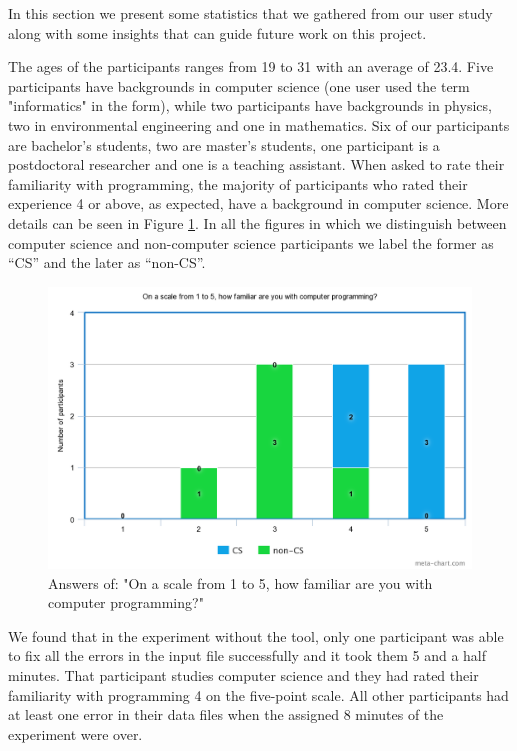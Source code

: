 \documentclass[10pt]{report}
\begin{document}
In this section we present some statistics that we gathered from our user study along with some insights that can guide future work on this project. 

The ages of the participants ranges from 19 to 31 with an average of 23.4. Five participants have backgrounds in computer science (one user used the term "informatics" in the form), while two participants have backgrounds in physics, two in environmental engineering and one in mathematics. Six of our participants are bachelor's students, two are master's students, one participant is a postdoctoral researcher and one is a teaching assistant. When asked to rate their familiarity with programming, the majority of participants who rated their experience 4 or above, as expected, have a background in computer science. More details can be seen in Figure \ref{rate}. In all the figures in which we distinguish between computer science and non-computer science participants we label the former as ``CS'' and the later as ``non-CS''. 

\begin{figure}[t]
	\includegraphics[width=1\linewidth]{rate.png}
	\caption{Answers of: "On a scale from 1 to 5, how familiar are you with computer programming?"}
	\label{rate}
\end{figure}


We found that in the experiment without the tool, only one participant was able to fix all the errors in the input file successfully and it took them 5 and a half minutes. That participant studies computer science and they had rated their familiarity with programming 4 on the five-point scale. All other participants had at least one error in their data files when the assigned 8 minutes of the experiment were over. 
\end{document}
